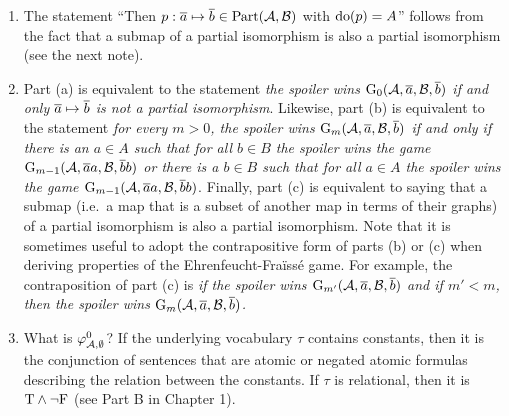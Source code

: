 \begin{enumerate}[1.]
\begin{fact}
If the duplicator does not have a winning strategy for $\game{m}(\strct{A}, \vect{a}, \strct{B}, \vect{b})$, i.e.~if he does not win every round of the game, then the spoiler has a winning strategy to ensure he wins every round of $\game{m}(\strct{A}, \vect{a}, \strct{B}, \vect{b})$.
\end{fact}
\begin{proof}
(INCOMPLETE) Construct a game tree for the spoiler: There is a choice for the spoiler such that for all choices for the duplicator\ldots
\end{proof}

See 2.3.16 in text for an example of spoiler having a winning strategy.
%
\item {} The statement ``Then $p : \overline{a} \mapsto \overline{b} \in \mathrm{Part}(\mathcal{A}, \mathcal{B})$ with $\mathrm{do}(p) = A$'' follows from the fact that a submap of a partial isomorphism is also a partial isomorphism (see the next note).
%
\item {} Part (a) is equivalent to the statement \emph{the spoiler wins $\game{0}(\strct{A}, \vect{a}, \strct{B}, \vect{b})$ if and only $\overline{a} \mapsto \overline{b}$ is not a partial isomorphism}.
\newpar
Likewise, part (b) is equivalent to the statement \emph{for every $m > 0$, the spoiler wins $\game{m}(\strct{A}, \vect{a}, \strct{B}, \vect{b})$ if and only if there is an $a \in A$ such that for all $b \in B$ the spoiler wins the game $\game{m - 1}(\strct{A}, \vect{a}a, \strct{B}, \vect{b}b)$ or there is a $b \in B$ such that for all $a \in A$ the spoiler wins the game $\game{m - 1}(\strct{A}, \vect{a}a, \strct{B}, \vect{b}b)$}.
\newpar
Finally, part (c) is equivalent to saying that a submap (i.e.\ a map that is a subset of another map in terms of their graphs) of a partial isomorphism is also a partial isomorphism.
\newpar
Note that it is sometimes useful to adopt the contrapositive form of parts (b) or (c) when deriving properties of the Ehrenfeucht-Fra\"iss\'e game. For example, the contraposition of part (c) is \emph{if the spoiler wins $\game{m'}(\strct{A}, \vect{a}, \strct{B}, \vect{b})$ and if $m' < m$, then the spoiler wins $\game{m}(\strct{A}, \vect{a}, \strct{B}, \vect{b})$.}
%
\item {} What is $\varphi^{0}_{\mathcal{A}, \emptyset}$? If the underlying vocabulary $\tau$ contains constants, then it is the conjunction of sentences that are atomic or negated atomic formulas describing the relation between the constants. If $\tau$ is relational, then it is $\mathrm{T} \land \neg\mathrm{F}$ (see Part B in Chapter 1).

\end{enumerate}
